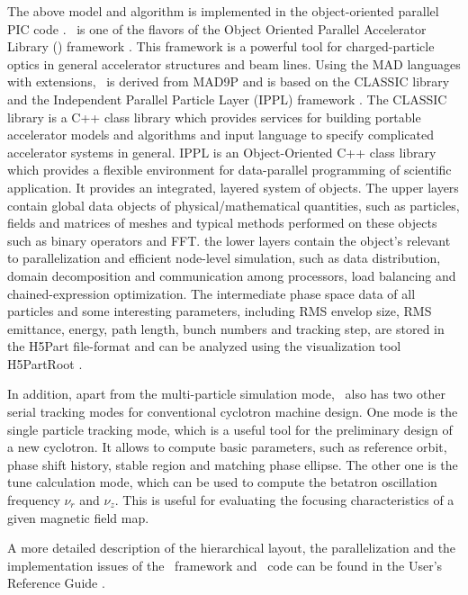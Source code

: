 \documentclass{JAC2003}
\begin{document}
The above model and algorithm is implemented in the object-oriented parallel PIC code \opalcycl. 
\opalcycl \  is one of the flavors of the Object Oriented Parallel Accelerator Library (\opal) framework \cite{opal:1}. This framework is a powerful tool for charged-particle optics in general accelerator structures and beam lines.
Using the MAD languages with extensions,
\opal \  is derived from MAD9P \cite{Ada:1} and is based on the CLASSIC \cite{Classic:1} library and the Independent Parallel Particle Layer (IPPL) framework \cite{Ippl:1}. 
The CLASSIC library is a C++ class library which provides services for building portable accelerator models and algorithms and input 
language to specify complicated accelerator systems in general. IPPL is an Object-Oriented C++ class library which provides a flexible
environment for data-parallel programming of scientific application. It provides an integrated, layered system of objects. The upper layers
contain global data objects of physical/mathematical quantities, such as particles, fields and matrices of meshes and typical methods
performed on these objects such as binary operators and FFT. the lower layers contain the object's relevant to parallelization and efficient node-level
simulation, such as data distribution, domain decomposition and communication among processors, load balancing and chained-expression optimization. 
The intermediate phase space data of all particles and some interesting parameters, 
including RMS envelop size, RMS emittance, energy, path length, bunch numbers and 
tracking step, are stored in the H5Part \cite{H5part:1} file-format and can be analyzed
using the visualization tool H5PartRoot \cite{Thomas:1}.

In addition, apart from the multi-particle simulation mode, \opalcycl \  also has two other serial tracking modes for conventional cyclotron machine design. 
One mode is the single particle tracking mode, which is a useful tool for 
the preliminary design of a new cyclotron. It allows to compute  basic parameters, such as reference orbit, phase shift history,
stable region and matching phase ellipse. The other one is the tune calculation mode, which can be used to compute the betatron oscillation frequency 
$\nu_r$ and $\nu_z$. This is useful for evaluating 
the focusing characteristics of a given magnetic field map. 

A more detailed description of the hierarchical layout, the parallelization and the implementation issues of the \opal \  framework and \opalcycl \  code
can be found in the User's Reference Guide \cite{opal:1}.  
\end{document}

